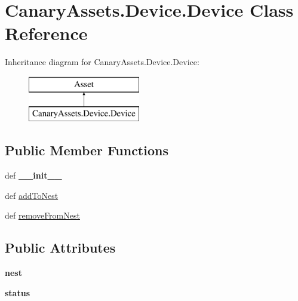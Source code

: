 \hypertarget{class_canary_assets_1_1_device_1_1_device}{\section{Canary\-Assets.\-Device.\-Device Class Reference}
\label{class_canary_assets_1_1_device_1_1_device}
}
Inheritance diagram for Canary\-Assets.\-Device.\-Device\-:\begin{figure}[H]
\begin{center}
\leavevmode
\includegraphics[height=2.000000cm]{class_canary_assets_1_1_device_1_1_device}
\end{center}
\end{figure}
\subsection*{Public Member Functions}
\begin{DoxyCompactItemize}
\item 
\hypertarget{class_canary_assets_1_1_device_1_1_device_ae1491c142e011fd608d2bf185a398d73}{def {\bfseries \-\_\-\-\_\-init\-\_\-\-\_\-}}\label{class_canary_assets_1_1_device_1_1_device_ae1491c142e011fd608d2bf185a398d73}

\item 
def \hyperlink{class_canary_assets_1_1_device_1_1_device_aa923fdac7f6bf5cb504f857fde36d92f}{add\-To\-Nest}
\item 
def \hyperlink{class_canary_assets_1_1_device_1_1_device_a170ceac43e5fc92c64d75a022c165b2e}{remove\-From\-Nest}
\end{DoxyCompactItemize}
\subsection*{Public Attributes}
\begin{DoxyCompactItemize}
\item 
\hypertarget{class_canary_assets_1_1_device_1_1_device_ada64a074316bd55b53edd92ab9cf829a}{{\bfseries nest}}\label{class_canary_assets_1_1_device_1_1_device_ada64a074316bd55b53edd92ab9cf829a}

\item 
\hypertarget{class_canary_assets_1_1_device_1_1_device_a019c36f9397232cb1f7b9b81da49aad5}{{\bfseries status}}\label{class_canary_assets_1_1_device_1_1_device_a019c36f9397232cb1f7b9b81da49aad5}

\end{DoxyCompactItemize}


